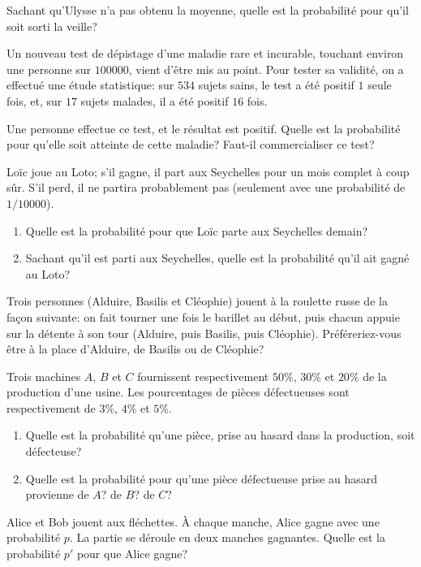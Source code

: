 \documentclass{yann}
\begin{document}
Sachant qu'Ulysse n'a pas obtenu la moyenne, quelle est la probabilité pour qu'il soit sorti la veille?

\Exercice

Un nouveau test de dépistage d'une maladie rare et incurable, touchant
environ une personne sur $100000$, vient d'être mis au point.
Pour tester sa validité, on a effectué une étude statistique:
sur $534$ sujets sains, le test a été positif $1$ seule fois,
et, sur $17$ sujets malades, il a été positif $16$ fois.

Une personne effectue ce test, et le résultat est positif.
Quelle est la probabilité pour qu'elle soit atteinte de cette maladie?
Faut-il commercialiser ce test?

\Exercice

Loïc joue au Loto; s'il gagne, il part aux Seychelles pour un mois complet à
coup sûr. S'il perd, il ne partira probablement pas (seulement avec une
probabilité de $1/10000$).
\begin{enumerate}
\item
Quelle est la probabilité pour que Loïc parte aux Seychelles demain?
\item
Sachant qu'il est parti aux Seychelles, quelle est la probabilité qu'il ait gagné au Loto?
\end{enumerate}

\Exercice

Trois personnes (Alduire, Basilis et Cléophie)
jouent à la roulette russe
de la façon suivante: on fait tourner une fois le barillet au début,
puis chacun appuie sur la détente à son tour
(Alduire, puis Basilis, puis Cléophie).
Préféreriez-vous être à la place d'Alduire, de Basilis ou de Cléophie?

\Exercice

Trois machines $A$, $B$ et $C$ fournissent respectivement $50\%$, $30\%$
et $20\%$ de la production d'une usine. Les pourcentages de pièces
défectueuses sont respectivement de $3\%$, $4\%$ et $5\%$.
\begin{enumerate}
\item
Quelle est la probabilité qu'une pièce, prise au hasard dans la production, soit défecteuse?
\item
Quelle est la probabilité pour qu'une pièce défectueuse prise au hasard
  provienne de $A$? de $B$? de $C$?
\end{enumerate}

\Exercice

Alice et Bob jouent aux fléchettes.
À chaque manche, Alice gagne avec une probabilité $p$.
La partie se déroule en deux manches gagnantes.
Quelle est la probabilité $p'$ pour que Alice gagne?
\end{document}
